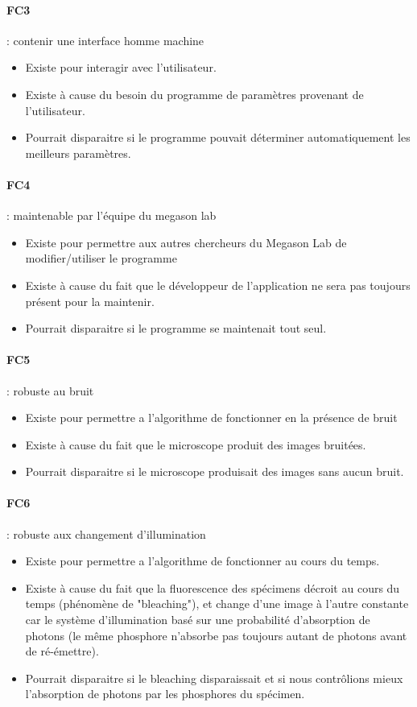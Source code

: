 \paragraph*{FC3} : contenir une interface homme machine
\begin{itemize}
  \item Existe pour interagir avec l'utilisateur.
  \item Existe à cause du besoin du programme de paramètres provenant de l'utilisateur.
  \item Pourrait disparaitre si le programme pouvait déterminer automatiquement les meilleurs paramètres.
\end{itemize}

\paragraph*{FC4} : maintenable par l'équipe du megason lab
\begin{itemize}
  \item Existe pour permettre aux autres chercheurs du Megason Lab de modifier/utiliser le programme
  \item Existe à cause du fait que le développeur de l'application ne sera pas toujours présent pour la maintenir.
  \item Pourrait disparaitre si le programme se maintenait tout seul.
\end{itemize}

\paragraph*{FC5} : robuste au bruit
\begin{itemize}
  \item Existe pour permettre a l'algorithme de fonctionner en la présence de bruit
  \item Existe à cause du fait que le microscope produit des images bruitées.
  \item Pourrait disparaitre si le microscope produisait des images sans aucun bruit.
\end{itemize}


\paragraph*{FC6} : robuste aux changement d'illumination
\begin{itemize}
  \item Existe pour permettre a l'algorithme de fonctionner au cours du temps. 
  \item Existe à cause du fait que la fluorescence des spécimens décroit au cours du temps (phénomène de "bleaching"),
  et change d'une image à l'autre constante car le système d'illumination basé sur une probabilité d'absorption de photons
  (le même phosphore n'absorbe pas toujours autant de photons avant de ré-émettre).
  \item Pourrait disparaitre si le bleaching disparaissait 
  et si nous contrôlions mieux l'absorption de photons par les phosphores du spécimen.
\end{itemize}

